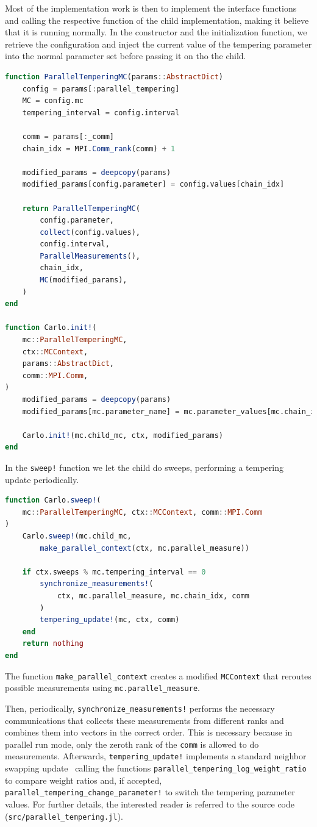 \documentclass{SciPost}
\begin{document}
Most of the implementation work is then to implement the interface functions and calling the respective function of the child implementation, making it believe that it is running normally. In the constructor and the initialization function, we retrieve the configuration and inject the current value of the tempering parameter into the normal parameter set before passing it on tho the child.
\begin{lstlisting}[language=julia]
function ParallelTemperingMC(params::AbstractDict)
    config = params[:parallel_tempering]
    MC = config.mc
    tempering_interval = config.interval

    comm = params[:_comm]
    chain_idx = MPI.Comm_rank(comm) + 1

    modified_params = deepcopy(params)
    modified_params[config.parameter] = config.values[chain_idx]

    return ParallelTemperingMC(
        config.parameter,
        collect(config.values),
        config.interval,
        ParallelMeasurements(),
        chain_idx,
        MC(modified_params),
    )
end

function Carlo.init!(
    mc::ParallelTemperingMC,
    ctx::MCContext,
    params::AbstractDict,
    comm::MPI.Comm,
)
    modified_params = deepcopy(params)
    modified_params[mc.parameter_name] = mc.parameter_values[mc.chain_idx]

    Carlo.init!(mc.child_mc, ctx, modified_params)
end
\end{lstlisting}
In the \texttt{sweep!} function we let the child do sweeps, performing a tempering update periodically.
\begin{lstlisting}[language=julia]
function Carlo.sweep!(
    mc::ParallelTemperingMC, ctx::MCContext, comm::MPI.Comm
)
    Carlo.sweep!(mc.child_mc,
        make_parallel_context(ctx, mc.parallel_measure))

    if ctx.sweeps % mc.tempering_interval == 0
        synchronize_measurements!(
            ctx, mc.parallel_measure, mc.chain_idx, comm
        )
        tempering_update!(mc, ctx, comm)
    end
    return nothing
end
\end{lstlisting}
The function \verb+make_parallel_context+ creates a modified \texttt{MCContext} that reroutes possible measurements using \verb+mc.parallel_measure+.

Then, periodically,
\verb+synchronize_measurements!+ performs the necessary communications that collects these measurements from different ranks and combines them into vectors in the correct order. This is necessary because in parallel run mode, only the zeroth rank of the \texttt{comm} is allowed to do measurements.
Afterwards, \texttt{tempering\_{}update!} implements a standard neighbor swapping update~\cite{Earl2005} calling the functions \verb+parallel_tempering_log_weight_ratio+ to compare weight ratios and, if accepted, \verb+parallel_tempering_change_parameter!+ to switch the tempering parameter values. For further details, the interested reader is referred to the source code (\texttt{src/parallel\_{}tempering.jl}).
\end{document}
